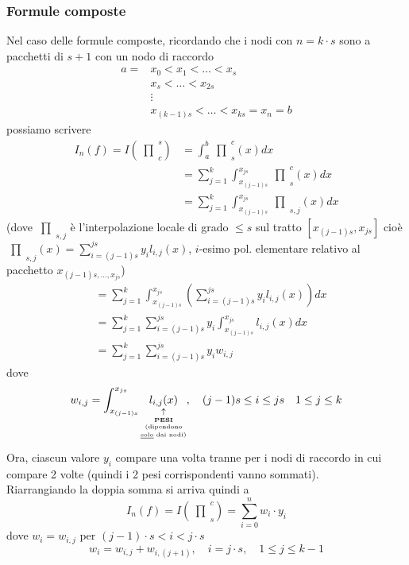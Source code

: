 \documentclass[12pt,a4paper]{article}
\newcommand{\inter}{\begin{matrix}\prod\end{matrix}}
\begin{document}
\subsubsection{Formule composte}
Nel caso delle formule composte, ricordando che i nodi con $n=k\cdot s$ sono a pacchetti di $s+1$ con un nodo di raccordo
\begin{equation*}
    \begin{split}
        a = & x_0 < x_1 < \dotso < x_s \\
        & x_s < \dotso < x_ {2s} \\
        & \vdots \\
        & x_{(k-1)s} < \dotso < x_{ks} = x_n = b
    \end{split}
\end{equation*}
possiamo scrivere
\begin{equation*}
    \begin{split}
        I_n(f) = I(\inter_c^s) & = \int_a^b \inter_s^c(x) dx \\
        & = \sum_{j=1}^k \int_{x_{(j-1)s}}^{x_{js}} \inter_s^c(x) dx \\
        & = \sum_{j=1}^k \int_{x_{(j-1)s}}^{x_{js}} \inter_{s,j}(x) dx
    \end{split}
\end{equation*}
(dove $\inter_{s,j}$ è l'interpolazione locale di grado $\leq s$ sul tratto $[x_{(j-1)s},x_{js}]$ cioè $\inter_{s,j}(x)=\sum_{i=(j-1)s}^{js} y_i l_{i,j} (x)$, $i$-esimo pol. elementare relativo al pacchetto $x_{(j-1)s, \dotso , x_{js}}$)
\begin{equation*}
    \begin{split}
        & = \sum_{j=1}^k \int_{x_{(j-1)s}}^{x_{js}} \left(\sum_{i=(j-1)s}^{js} y_i l_{i,j}(x) \right) dx \\ 
        & = \sum_{j=1}^k \sum_{i=(j-1)s}^{js} y_i \int_{x_{(j-1)s}}^{x_{js}} l_{i,j}(x)dx \\
        & = \sum_{j=1}^k \sum_{i=(j-1)s}^{js} y_i w_{i,j}
    \end{split}
\end{equation*}
dove 
\[w_{i,j} = \int_{x_{(j-1)s}}^{x_{js}} \underset{\underset{\underset{\underset{\text{\uline{solo} dai nodi)}}{\text{(dipendono}}}{\textbf{PESI}}}{\uparrow}}{l_{i,j}(x)} , \quad (j-1)s \leq i \leq js \quad  1 \leq j \leq k\]
Ora, ciascun valore $y_i$ compare una volta tranne per i nodi di raccordo in cui compare 2 volte (quindi i 2 pesi corrispondenti vanno sommati).\\
Riarrangiando la doppia somma si arriva quindi a
\[
I_n (f) = I(\inter_s^c) = \sum_{i=0}^n w_i \cdot y_i
\]
dove $w_i = w_{i,j}$ per $(j-1) \cdot s < i < j \cdot s$
\[
w_i = w_{i,j} + w_{i,(j+1)}, \quad i=j \cdot s, \quad 1 \leq j \leq k-1
\]
\end{document}

